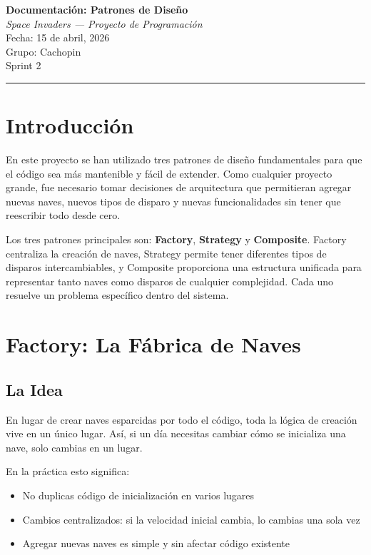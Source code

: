 \documentclass[12pt]{article}
\begin{document}
\begin{center}
    {\LARGE \textbf{Documentación: Patrones de Diseño}}\\[0.4em]
    {\large \textit{Space Invaders — Proyecto de Programación}}\\[0.3em]
    {\small Fecha: 15 de abril, 2026}\\[0.2em]
    {\small Grupo: Cachopin}\\[0.2em]
    {\small Sprint 2}
\end{center}

\vspace{0.5em}
\hrule
\vspace{1.5em}
\onehalfspacing
\newpage
\tableofcontents
\newpage

\section{Introducción}

En este proyecto se han utilizado tres patrones de diseño fundamentales para que el código sea más mantenible y fácil de extender. Como cualquier proyecto grande, fue necesario tomar decisiones de arquitectura que permitieran agregar nuevas naves, nuevos tipos de disparo y nuevas funcionalidades sin tener que reescribir todo desde cero.

Los tres patrones principales son: \textbf{Factory}, \textbf{Strategy} y \textbf{Composite}. Factory centraliza la creación de naves, Strategy permite tener diferentes tipos de disparos intercambiables, y Composite proporciona una estructura unificada para representar tanto naves como disparos de cualquier complejidad. Cada uno resuelve un problema específico dentro del sistema.

\newpage
\section{Factory: La Fábrica de Naves}

\subsection{La Idea}

En lugar de crear naves esparcidas por todo el código, toda la lógica de creación vive en un único lugar. Así, si un día necesitas cambiar cómo se inicializa una nave, solo cambias en un lugar.

En la práctica esto significa:
\begin{itemize}
    \item No duplicas código de inicialización en varios lugares
    \item Cambios centralizados: si la velocidad inicial cambia, lo cambias una sola vez
    \item Agregar nuevas naves es simple y sin afectar código existente
\end{itemize}
\end{document}
